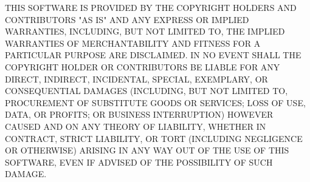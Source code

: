 {THIS SOFTWARE IS PROVIDED BY THE COPYRIGHT HOLDERS AND CONTRIBUTORS "AS IS" AND
ANY EXPRESS OR IMPLIED WARRANTIES, INCLUDING, BUT NOT LIMITED TO, THE IMPLIED
WARRANTIES OF MERCHANTABILITY AND FITNESS FOR A PARTICULAR PURPOSE ARE
DISCLAIMED. IN NO EVENT SHALL THE COPYRIGHT HOLDER OR CONTRIBUTORS BE LIABLE FOR
ANY DIRECT, INDIRECT, INCIDENTAL, SPECIAL, EXEMPLARY, OR CONSEQUENTIAL DAMAGES
(INCLUDING, BUT NOT LIMITED TO, PROCUREMENT OF SUBSTITUTE GOODS OR SERVICES;
LOSS OF USE, DATA, OR PROFITS; OR BUSINESS INTERRUPTION) HOWEVER CAUSED AND ON
ANY THEORY OF LIABILITY, WHETHER IN CONTRACT, STRICT LIABILITY, OR TORT
(INCLUDING NEGLIGENCE OR OTHERWISE) ARISING IN ANY WAY OUT OF THE USE OF THIS
SOFTWARE, EVEN IF ADVISED OF THE POSSIBILITY OF SUCH DAMAGE.

}
